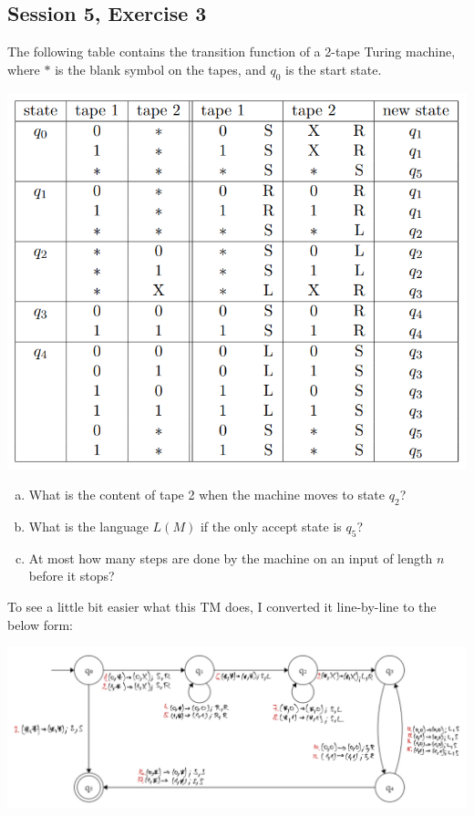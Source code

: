 \subsection {Session 5, Exercise 3}

\label{6f3}


The following table contains the transition function of a 2-tape Turing machine, where $*$ is the blank symbol on the tapes, and $q_0$ is the start state.

\begin{center}
\includegraphics[width=0.7\linewidth]{05/6_3_task.png}
\end{center}

\begin{enumerate}[a)]
    \item What is the content of tape 2 when the machine moves to state $q_2$?
    \item What is the language $L(M)$ if the only accept state is $q_5$?
    \item At most how many steps are done by the machine on an input of length $n$ before it stops?
\end{enumerate}


To see a little bit easier what this TM does, I converted it line-by-line to the below form:

\includegraphics[width=\linewidth]{05/6_3_canvas.png}

